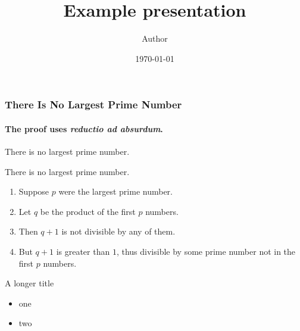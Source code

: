 \documentclass[aspectratio=169]{beamer}
\title{Example presentation}
\date[\today]{\today}
\author[Author]{Author}
\begin{document}
\begin{frame}[plain]
\titlepage
\end{frame}


\begin{frame}
\frametitle{There Is No Largest Prime Number}
\framesubtitle{The proof uses \textit{reductio ad absurdum}.}
\begin{theorem}[test]
There is no largest prime number. \end{theorem}
\begin{theorem}[test]
There is no largest prime number. \end{theorem}
\begin{enumerate}
\item<1-| alert@1> Suppose $p$ were the largest prime number.
\item<2-> Let $q$ be the product of the first $p$ numbers.
\item<3-> Then $q+1$ is not divisible by any of them.
\item<1-> But $q + 1$ is greater than $1$, thus divisible by some prime
number not in the first $p$ numbers.
\end{enumerate}
\end{frame}

\begin{frame}{A longer title}
\begin{itemize}
\item one
\item two
\end{itemize}
\end{frame}
\end{document}
